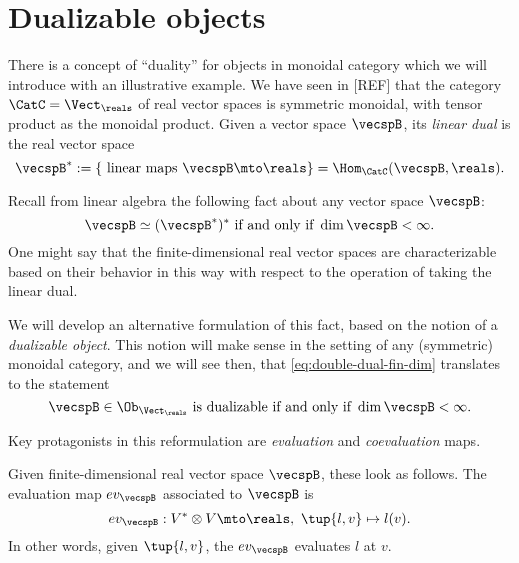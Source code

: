 

\section{Dualizable objects}
\label{sec:dual-objects}


There is a concept of ``duality'' for objects in monoidal category which we will introduce with an illustrative example. We have seen in [REF] that the category $\CatC = \Vect_{\reals}$ of real vector spaces is symmetric monoidal, with tensor product as the monoidal product. Given a vector space $\vecspB$, its \emph{linear dual} is the real vector space
\begin{equation}
\vecspB^{*} := \{ \text{ linear maps } \vecspB \mto \reals \} = \Hom_{\CatC}(\vecspB, \reals). 
\end{equation}

Recall from linear algebra the following fact about any vector space $\vecspB$: 
\begin{equation}\label{eq:double-dual-fin-dim}
\vecspB \simeq (\vecspB^{*})^* \text{ if and only if } \dim \vecspB < \infty.  
\end{equation}
One might say that the finite-dimensional real vector spaces are characterizable based on their behavior in this way with respect to the operation of taking the linear dual. 

We will develop an alternative formulation of this fact, based on the notion of a \emph{dualizable object}. This notion will make sense in the setting of any (symmetric) monoidal category, and we will see then, that \cref{eq:double-dual-fin-dim} translates to the statement
\begin{equation}\label{eq:dualizable-fin-dim}
\vecspB \in \Ob_{\Vect_\reals} \text{ is dualizable if and only if } \dim \vecspB < \infty.  
\end{equation}

Key protagonists in this reformulation are \emph{evaluation} and \emph{coevaluation} maps. 

Given finite-dimensional real vector space $\vecspB$, these look as follows. The evaluation map $ev_\vecspB$ associated to $\vecspB$ is
\begin{equation}\label{eq:evaluation-vecsp}
ev_\vecspB : V^* \otimes V \mto \reals, \ \tup{l, v} \mapsto l(v).
\end{equation}
In other words, given $\tup{l, v}$, the $ev_\vecspB$ evaluates $l$ at $v$. 

